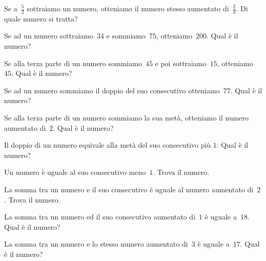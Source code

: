 \begin{multicols}{2}
\begin{esercizio}[\Ast]
\label{ese:16.10}
Se a~$\frac{5}{2}$ sottraiamo un numero, otteniamo il numero stesso aumentato di~$\frac{2}{3}$. Di quale numero si tratta?
\end{esercizio}

\begin{esercizio}[\Ast]
\label{ese:16.11}
Se ad un numero sottraiamo~$34$ e sommiamo~$75$, otteniamo~$200$. Qual è il numero?
\end{esercizio}

\begin{esercizio}[\Ast]
\label{ese:16.12}
Se alla terza parte di un numero sommiamo~$45$ e poi sottraiamo~$15$, otteniamo~$45$. Qual è il numero?
\end{esercizio}

\begin{esercizio}[\Ast]
\label{ese:16.13}
Se ad un numero sommiamo il doppio del suo consecutivo otteniamo~$77$. Qual è il numero?
\end{esercizio}

\begin{esercizio}[\Ast]
\label{ese:16.14}
Se alla terza parte di un numero sommiamo la sua metà, otteniamo il numero aumentato di~$2$. Qual è il numero?
\end{esercizio}

\begin{esercizio}[\Ast]
\label{ese:16.15}
Il doppio di un numero equivale alla metà del suo consecutivo più $1$. Qual è il numero?
\end{esercizio}

\begin{esercizio}[\Ast]
\label{ese:16.16}
Un numero è uguale al suo consecutivo meno~$1$. Trova il numero.
\end{esercizio}

\begin{esercizio}[\Ast]
\label{ese:16.17}
La somma tra un numero e il suo consecutivo è uguale al numero aumentato di~$2$. Trova il numero.
\end{esercizio}

\begin{esercizio}[\Ast]
\label{ese:16.18}
La somma tra un numero ed il suo consecutivo aumentato di~$1$ è uguale a~$18$. Qual è il numero?
\end{esercizio}

\begin{esercizio}
\label{ese:16.19}
La somma tra un numero e lo stesso numero aumentato di~$3$ è uguale a~$17$. Qual è il numero?
\end{esercizio}


\end{multicols}
